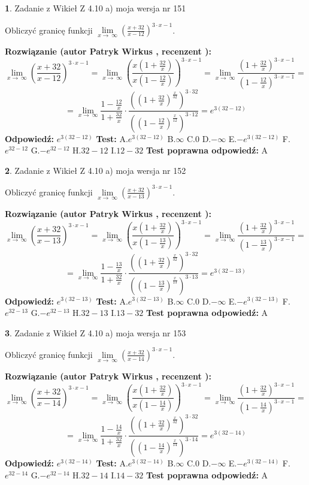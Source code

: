 \documentclass[12pt, a4paper]{article}
\theoremstyle{definition} %
\newtheorem{zad}{}
\newcommand{\zadStart}[1]{\begin{zad}#1\newline}
\newcommand{\zadStop}{\end{zad}}
\newcommand{\rozwStart}[2]{\noindent \textbf{Rozwiązanie (autor #1 , recenzent #2): }\newline}
\newcommand{\rozwStop}{\newline}
\newcommand{\odpStart}{\noindent \textbf{Odpowiedź:}\newline}
\newcommand{\odpStop}{\newline}
\newcommand{\testStart}{\noindent \textbf{Test:}\newline}
\newcommand{\testStop}{\newline}
\newcommand{\kluczStart}{\noindent \textbf{Test poprawna odpowiedź:}\newline}
\newcommand{\kluczStop}{\newline}
\begin{document}
\zadStart{Zadanie z Wikieł Z 4.10 a) moja wersja nr 151}


Obliczyć granicę funkcji  $\lim\limits_{x\to\ \infty}(\frac{x+32}{x-12})^{3\cdot x-1}$.
\zadStop
\rozwStart{Patryk Wirkus}{}
$$\lim\limits_{x\to\ \infty}(\frac{x+32}{x-12})^{3\cdot x-1} = \lim\limits_{x\to\ \infty}(\frac{x(1+\frac{32}{x})}{x(1-\frac{12}{x})})^{3\cdot x-1}=\lim\limits_{x\to\ \infty}\frac{(1+\frac{32}{x})^{3\cdot x-1}}{(1-\frac{12}{x})^{3\cdot x-1}}=$$
$$=\lim\limits_{x\to\ \infty}\frac{1-\frac{12}{x}}{1+\frac{32}{x}}\cdot\frac{((1+\frac{32}{x})^{\frac{x}{32}})^{3\cdot32}}{((1-\frac{12}{x})^{\frac{x}{12}})^{3\cdot12}}=e^{3(32-12)}$$
\rozwStop
\odpStart
$e^{3(32-12)}$
\odpStop
\testStart
A.$e^{3(32-12)}$ B.$\infty$ C.$0$ D.$-\infty$ E.$-e^{3(32-12)}$
F.$e^{32-12}$ G.$-e^{32-12}$
H.$32-12$
I.$12-32$
\testStop
\kluczStart
A
\kluczStop



\zadStart{Zadanie z Wikieł Z 4.10 a) moja wersja nr 152}


Obliczyć granicę funkcji  $\lim\limits_{x\to\ \infty}(\frac{x+32}{x-13})^{3\cdot x-1}$.
\zadStop
\rozwStart{Patryk Wirkus}{}
$$\lim\limits_{x\to\ \infty}(\frac{x+32}{x-13})^{3\cdot x-1} = \lim\limits_{x\to\ \infty}(\frac{x(1+\frac{32}{x})}{x(1-\frac{13}{x})})^{3\cdot x-1}=\lim\limits_{x\to\ \infty}\frac{(1+\frac{32}{x})^{3\cdot x-1}}{(1-\frac{13}{x})^{3\cdot x-1}}=$$
$$=\lim\limits_{x\to\ \infty}\frac{1-\frac{13}{x}}{1+\frac{32}{x}}\cdot\frac{((1+\frac{32}{x})^{\frac{x}{32}})^{3\cdot32}}{((1-\frac{13}{x})^{\frac{x}{13}})^{3\cdot13}}=e^{3(32-13)}$$
\rozwStop
\odpStart
$e^{3(32-13)}$
\odpStop
\testStart
A.$e^{3(32-13)}$ B.$\infty$ C.$0$ D.$-\infty$ E.$-e^{3(32-13)}$
F.$e^{32-13}$ G.$-e^{32-13}$
H.$32-13$
I.$13-32$
\testStop
\kluczStart
A
\kluczStop



\zadStart{Zadanie z Wikieł Z 4.10 a) moja wersja nr 153}


Obliczyć granicę funkcji  $\lim\limits_{x\to\ \infty}(\frac{x+32}{x-14})^{3\cdot x-1}$.
\zadStop
\rozwStart{Patryk Wirkus}{}
$$\lim\limits_{x\to\ \infty}(\frac{x+32}{x-14})^{3\cdot x-1} = \lim\limits_{x\to\ \infty}(\frac{x(1+\frac{32}{x})}{x(1-\frac{14}{x})})^{3\cdot x-1}=\lim\limits_{x\to\ \infty}\frac{(1+\frac{32}{x})^{3\cdot x-1}}{(1-\frac{14}{x})^{3\cdot x-1}}=$$
$$=\lim\limits_{x\to\ \infty}\frac{1-\frac{14}{x}}{1+\frac{32}{x}}\cdot\frac{((1+\frac{32}{x})^{\frac{x}{32}})^{3\cdot32}}{((1-\frac{14}{x})^{\frac{x}{14}})^{3\cdot14}}=e^{3(32-14)}$$
\rozwStop
\odpStart
$e^{3(32-14)}$
\odpStop
\testStart
A.$e^{3(32-14)}$ B.$\infty$ C.$0$ D.$-\infty$ E.$-e^{3(32-14)}$
F.$e^{32-14}$ G.$-e^{32-14}$
H.$32-14$
I.$14-32$
\testStop
\kluczStart
A
\kluczStop
\end{document}
